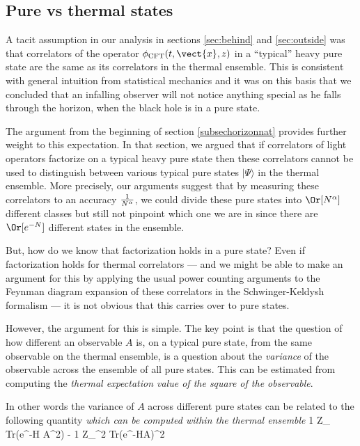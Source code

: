 \subsection{Pure vs thermal states}

A tacit assumption in our analysis in sections \ref{sec:behind} and \ref{sec:outside} was that correlators of the operator $\phi_{\rm CFT}(t,\vect{x},z)$ in a ``typical'' heavy pure state are the same as its correlators in
the thermal ensemble. This is consistent with general intuition from statistical mechanics and it was on this basis that we concluded that an infalling observer will not notice anything special as he falls through the horizon, when the black hole is in a pure state.


The argument from the beginning of section \ref{subsechorizonnat} provides further weight to this expectation. In that section, we argued that if
correlators of light operators factorize on a typical heavy pure state
then these correlators cannot be used to distinguish between various typical pure states $|\Psi \rangle$ in the thermal ensemble. More precisely, our arguments suggest that by measuring these correlators to an accuracy ${1 \over N^{\alpha}}$, we could divide these pure states into $\Or[N^{\alpha}]$ different classes but still not pinpoint which one we are in since there are $\Or[e^{-N}]$ different states in the ensemble. 

But, how do we know that factorization holds in a pure state? Even if 
factorization holds for thermal correlators --- and we might be able
to make an argument for this by applying the usual power counting
arguments to the Feynman diagram expansion of these correlators in the 
Schwinger-Keldysh formalism --- it is not obvious that this carries over to pure states.

However, the argument for this is simple. The key point is that the question of how different an observable $A$ is, on a typical pure state, from the same observable on the thermal ensemble, is a question about the {\it variance} of the observable across the ensemble of all pure states. This can be estimated from computing the {\it thermal expectation value of the square of the observable}. 

In other words the variance of $A$ across different pure states can be related to the following quantity {\it which can be computed within the thermal ensemble}
\be
\label{variance}
{1 \over Z_{\beta}} {\rm Tr}(e^{-\beta H} A^2) - {1 \over Z_{\beta}^2} {\rm Tr}(e^{-\beta H}A)^2  
\ee

